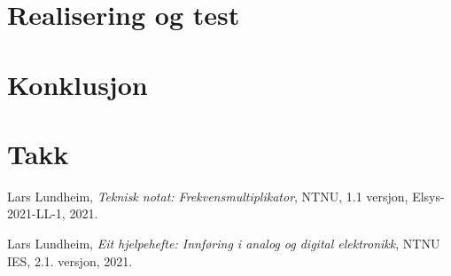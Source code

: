 \documentclass[a4paper,11pt,norsk]{article}
\begin{document}
\section{Realisering og test}
\label{sec:realisering}

\section{Konklusjon}
\label{sec:konklusjon}

\section{Takk}

\newpage
{}
{}
\begin{thebibliography}{99}

  Lars	Lundheim,
  \emph{Teknisk notat: Frekvensmultiplikator},
  NTNU,
  1.1 versjon,
  Elsys-2021-LL-1,
  2021.

  Lars	Lundheim,
  \emph{Eit hjelpehefte: Innføring i analog og digital elektronikk},
  NTNU IES,
  2.1. versjon,
  2021.

\end{thebibliography}

{}
\appendix
\label{sec:Vedlegg}

\end{document}
